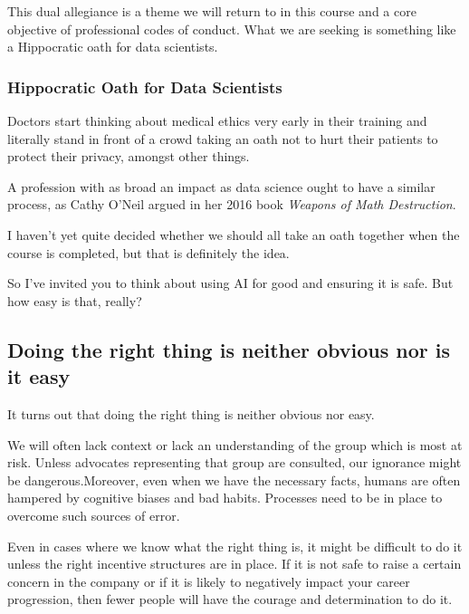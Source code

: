 \documentclass[
]{book}
\theoremstyle{definition}
\theoremstyle{definition}
\theoremstyle{definition}
\theoremstyle{definition}
\theoremstyle{remark}
\begin{document}
This dual allegiance is a theme we will return to in this course and a core objective of professional codes of conduct. What we are seeking is something like a Hippocratic oath for data scientists.

\hypertarget{hippocratic-oath-for-data-scientists}{%
\subsubsection{Hippocratic Oath for Data Scientists}\label{hippocratic-oath-for-data-scientists}}

Doctors start thinking about medical ethics very early in their training and literally stand in front of a crowd taking an oath not to hurt their patients to protect their privacy, amongst other things.

A profession with as broad an impact as data science ought to have a similar process, as Cathy O'Neil argued in her 2016 book \emph{Weapons of Math Destruction}.

I haven't yet quite decided whether we should all take an oath together when the course is completed, but that is definitely the idea.

So I've invited you to think about using AI for good and ensuring it is safe. But how easy is that, really?

\hypertarget{doing-the-right-thing-is-neither-obvious-nor-is-it-easy}{%
\subsection{Doing the right thing is neither obvious nor is it easy}\label{doing-the-right-thing-is-neither-obvious-nor-is-it-easy}}

It turns out that doing the right thing is neither obvious nor easy.

We will often lack context or lack an understanding of the group which is most at risk. Unless advocates representing that group are consulted, our ignorance might be dangerous.Moreover, even when we have the necessary facts, humans are often hampered by cognitive biases and bad habits. Processes need to be in place to overcome such sources of error.

Even in cases where we know what the right thing is, it might be difficult to do it unless the right incentive structures are in place. If it is not safe to raise a certain concern in the company or if it is likely to negatively impact your career progression, then fewer people will have the courage and determination to do it.
\end{document}
